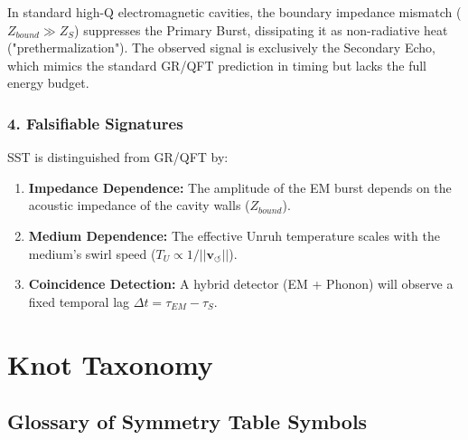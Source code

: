 \documentclass[10pt,reprint,aps,onecolumn,nofootinbib]{revtex4-2}
\begin{document}
                In standard high-Q electromagnetic cavities, the boundary impedance mismatch ($Z_{bound} \gg Z_S$) suppresses the Primary Burst, dissipating it as non-radiative heat ("prethermalization"). The observed signal is exclusively the Secondary Echo, which mimics the standard GR/QFT prediction in timing but lacks the full energy budget.



            \subsubsection*{\textbf{4. Falsifiable Signatures}}


                SST is distinguished from GR/QFT by:

                \begin{enumerate}
                        \item \textbf{Impedance Dependence:} The amplitude of the EM burst depends on the acoustic impedance of the cavity walls ($Z_{bound}$).


                        \item \textbf{Medium Dependence:} The effective Unruh temperature scales with the medium's swirl speed ($T_U \propto 1/||\mathbf{v}_{\circlearrowleft}||$).


                        \item \textbf{Coincidence Detection:} A hybrid detector (EM + Phonon) will observe a fixed temporal lag $\Delta t = \tau_{EM} - \tau_S$.


                \end{enumerate}

    \section{Knot Taxonomy}
    \subsection{Glossary of Symmetry Table Symbols}
        \label{sec:glossary-of-symmetry-table-symbols}
\end{document}
